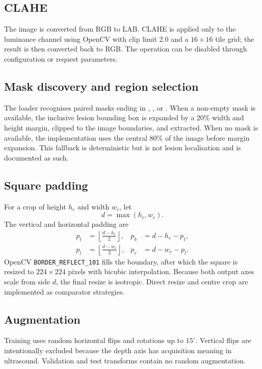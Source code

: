 \subsection{CLAHE}
The image is converted from RGB to LAB. CLAHE is applied only to the luminance channel using OpenCV with clip limit 2.0 and a $16\times16$ tile grid; the result is then converted back to RGB. The operation can be disabled through configuration or request parameters.

\subsection{Mask discovery and region selection}
The loader recognises paired masks ending in , , or . When a non-empty mask is available, the inclusive lesion bounding box is expanded by a 20\% width and height margin, clipped to the image boundaries, and extracted. When no mask is available, the implementation uses the central 80\% of the image before margin expansion. This fallback is deterministic but is not lesion localisation and is documented as such.

\subsection{Square padding}
For a crop of height $h_c$ and width $w_c$, let
\begin{equation}
d=\max(h_c,w_c).
\end{equation}
The vertical and horizontal padding are
\begin{align}
p_t &= \left\lfloor\frac{d-h_c}{2}\right\rfloor,
&p_b &= d-h_c-p_t,\\
p_l &= \left\lfloor\frac{d-w_c}{2}\right\rfloor,
&p_r &= d-w_c-p_l.
\end{align}
OpenCV \texttt{BORDER\_REFLECT\_101} fills the boundary, after which the square is resized to $224\times224$ pixels with bicubic interpolation. Because both output axes scale from side $d$, the final resize is isotropic. Direct resize and centre crop are implemented as comparator strategies.

\subsection{Augmentation}
Training uses random horizontal flips and rotations up to $15^{\circ}$. Vertical flips are intentionally excluded because the depth axis has acquisition meaning in ultrasound. Validation and test transforms contain no random augmentation.


